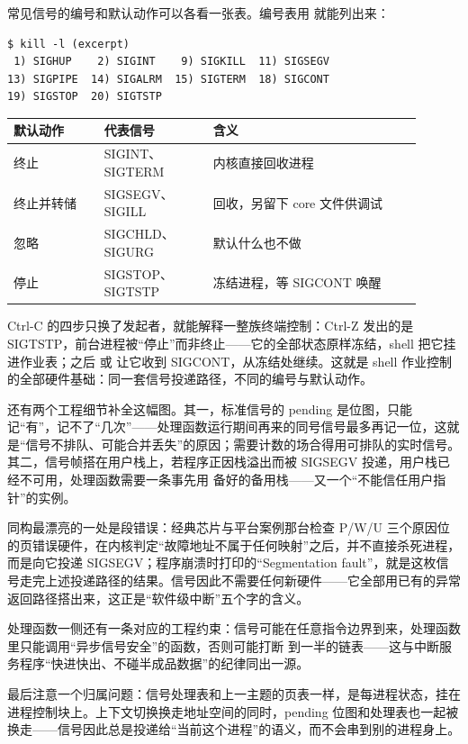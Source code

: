 常见信号的编号和默认动作可以各看一张表。编号表用  就能列出来：

\begin{lstlisting}
$ kill -l (excerpt)
 1) SIGHUP    2) SIGINT    9) SIGKILL  11) SIGSEGV
13) SIGPIPE  14) SIGALRM  15) SIGTERM  18) SIGCONT
19) SIGSTOP  20) SIGTSTP
\end{lstlisting}

\begin{longtable}{L{0.20\linewidth}L{0.24\linewidth}L{0.46\linewidth}}
\toprule
默认动作 & 代表信号 & 含义 \\
\midrule
终止 & SIGINT、SIGTERM & 内核直接回收进程 \\\tablerowrule
终止并转储 & SIGSEGV、SIGILL & 回收，另留下 core 文件供调试 \\\tablerowrule
忽略 & SIGCHLD、SIGURG & 默认什么也不做 \\\tablerowrule
停止 & SIGSTOP、SIGTSTP & 冻结进程，等 SIGCONT 唤醒 \\
\bottomrule
\end{longtable}

Ctrl-C 的四步只换了发起者，就能解释一整族终端控制：Ctrl-Z 发出的是 SIGTSTP，前台进程被“停止”而非终止——它的全部状态原样冻结，shell 把它挂进作业表；之后  或  让它收到 SIGCONT，从冻结处继续。这就是 shell 作业控制的全部硬件基础：同一套信号投递路径，不同的编号与默认动作。

还有两个工程细节补全这幅图。其一，标准信号的 pending 是位图，只能记“有”，记不了“几次”——处理函数运行期间再来的同号信号最多再记一位，这就是“信号不排队、可能合并丢失”的原因；需要计数的场合得用可排队的实时信号。其二，信号帧搭在用户栈上，若程序正因栈溢出而被 SIGSEGV 投递，用户栈已经不可用，处理函数需要一条事先用  备好的备用栈——又一个“不能信任用户指针”的实例。

同构最漂亮的一处是段错误：经典芯片与平台案例那台检查 P/W/U 三个原因位的页错误硬件，在内核判定“故障地址不属于任何映射”之后，并不直接杀死进程，而是向它投递 SIGSEGV；程序崩溃时打印的“Segmentation fault”，就是这枚信号走完上述投递路径的结果。信号因此不需要任何新硬件——它全部用已有的异常返回路径搭出来，这正是“软件级中断”五个字的含义。

处理函数一侧还有一条对应的工程约束：信号可能在任意指令边界到来，处理函数里只能调用“异步信号安全”的函数，否则可能打断  到一半的链表——这与中断服务程序“快进快出、不碰半成品数据”的纪律同出一源。

最后注意一个归属问题：信号处理表和上一主题的页表一样，是每进程状态，挂在进程控制块上。上下文切换换走地址空间的同时，pending 位图和处理表也一起被换走——信号因此总是投递给“当前这个进程”的语义，而不会串到别的进程身上。

